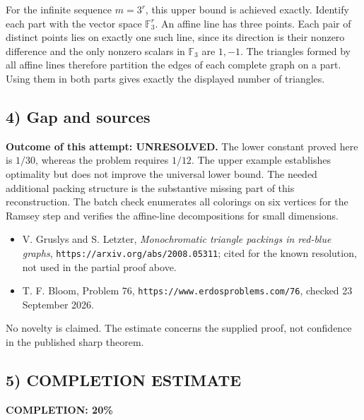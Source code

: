 For the infinite sequence $m=3^r$, this upper bound is achieved
exactly. Identify each part with the vector space $\mathbb F_3^r$.
An affine line has three points. Each pair of distinct points lies
on exactly one such line, since its direction is their nonzero
difference and the only nonzero scalars in $\mathbb F_3$ are
$1,-1$. The triangles formed by all affine lines therefore partition
the edges of each complete graph on a part. Using them in both
parts gives exactly the displayed number of triangles.

\subsection{4) Gap and sources}
\textbf{Outcome of this attempt: UNRESOLVED.} The lower constant
proved here is $1/30$, whereas the problem requires $1/12$.
The upper example establishes optimality but does not improve the
universal lower bound. The needed additional packing structure is
the substantive missing part of this reconstruction. The batch check
enumerates all colorings on six vertices for the Ramsey step and
verifies the affine-line decompositions for small dimensions.

\begin{itemize}
\item V. Gruslys and S. Letzter, \emph{Monochromatic triangle
packings in red-blue graphs},
\texttt{https://arxiv.org/abs/2008.05311}; cited for the known
resolution, not used in the partial proof above.
\item T. F. Bloom, Problem 76,
\texttt{https://www.erdosproblems.com/76}, checked 23 September 2026.
\end{itemize}
No novelty is claimed. The estimate concerns the supplied proof,
not confidence in the published sharp theorem.
\subsection{5) COMPLETION ESTIMATE}
\textbf{COMPLETION: 20\%}
